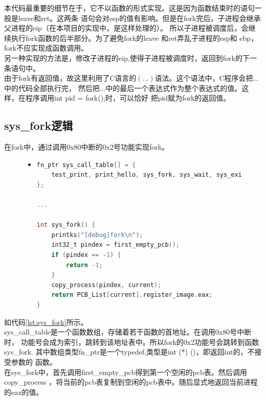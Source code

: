 \documentclass[a4paper]{article}
\begin{document}
    本代码最重要的细节在于，它不以函数的形式实现。这是因为函数结束时的语句一般是leave和ret。这两条
    语句会对esp的值有影响。但是在fork完后，子进程会继承父进程的eip（在本项目的实现中，是这样处理的）。
    所以子进程被调度后，会继续执行fork函数的后半部分。为了避免fork的leave 和ret弄乱子进程的esp和
    ebp，fork不应实现成函数调用。\\ 

    另一种实现的方法是，修改子进程的eip,使得子进程被调度时，返回到fork的下一条语句中。 \\ 

    由于fork有返回值，故这里利用了C语言的$({...})$语法。这个语法中，C程序会把...中的代码全部执行完，
    然后把...中的最后一个表达式作为整个表达式的值。这样，在程序调用int pid = fork();时，可以恰好
    把pid赋为fork的返回值。
    \subsection{sys_fork逻辑}
    在fork中，通过调用0x80中断的0x2号功能实现fork。
    \begin{figure}
    \begin{itemize}
    \item[] \begin{lstlisting}[language=C, label=lst:sys_fork, caption=sys_fork逻辑]
fn_ptr sys_call_table[] = {
    test_print, print_hello, sys_fork, sys_wait, sys_exit
};

...

int sys_fork() {
    printks("[debug]fork\n");
    int32_t pindex = first_empty_pcb();
    if (pindex == -1) {
        return -1;
    }
    copy_process(pindex, current);
    return PCB_List[current].register_image.eax;
}

    \end{lstlisting}
    \end{itemize}
    \end{figure}
    如代码\ref{lst:sys_fork}所示。\\ 

    sys_call_table是一个函数数组，存储着若干函数的首地址。在调用0x80号中断时，
    功能号会成为索引，跳转到该地址表中。所以fork的0x2功能号会跳转到函数sys_fork.
    其中数组类型fn_ptr是一个typedef,类型是int (*) ()，即返回int的，不接受参数的
    函数。\\ 

    在sys_fork中，首先调用first_empty_pcb得到第一个空闲的pcb表。然后调用copy_process
    ，将当前的pcb表复制到空闲的pcb表中。随后显式地返回当前进程的eax的值。
\end{document}
